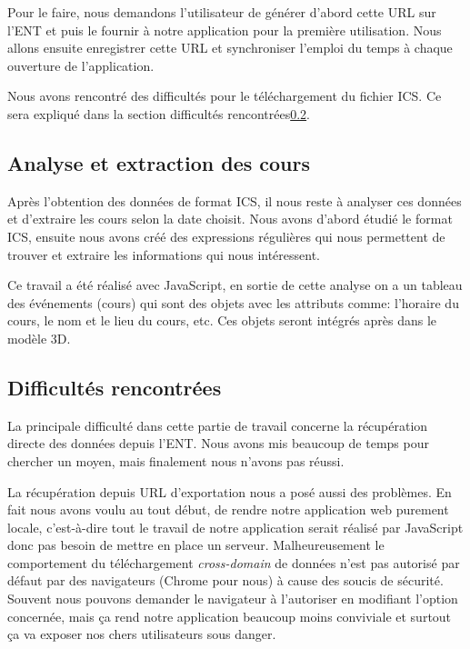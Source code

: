 \documentclass[twoside]{EPURapport}
\begin{document}
Pour le faire, nous demandons l'utilisateur de générer d'abord cette URL sur l'ENT et puis le fournir à notre application pour la première utilisation. Nous allons ensuite enregistrer cette URL et synchroniser l'emploi du temps à chaque ouverture de l'application.


Nous avons rencontré des difficultés pour le téléchargement du fichier ICS. Ce sera expliqué dans la section difficultés rencontrées\ref{sec_diff}.

\subsection{Analyse et extraction des cours}%
Après l'obtention des données de format ICS, il nous reste à analyser ces données et d'extraire les cours selon la date choisit. Nous avons d'abord étudié le format ICS, ensuite nous avons créé des expressions régulières qui nous permettent de trouver et extraire les informations qui nous intéressent. 


Ce travail a été réalisé avec JavaScript, en sortie de cette analyse on a un tableau des événements (cours) qui sont des objets avec les attributs comme: l'horaire du cours, le nom et le lieu du cours, etc. Ces objets seront intégrés après dans le modèle 3D.


\subsection{Difficultés rencontrées}\label{sec_diff} %
La principale difficulté dans cette partie de travail concerne la récupération directe des données depuis l'ENT. Nous avons mis beaucoup de temps pour chercher un moyen, mais finalement nous n'avons pas réussi.


La récupération depuis URL d'exportation nous a posé aussi des problèmes. En fait nous avons voulu au tout début, de rendre notre application web purement locale, c'est-à-dire tout le travail de notre application serait réalisé par JavaScript donc pas besoin de mettre en place un serveur. Malheureusement le comportement du téléchargement \textit{cross-domain} de données n'est pas autorisé par défaut par des navigateurs (Chrome pour nous) à cause des soucis de sécurité. Souvent nous pouvons demander le navigateur à l'autoriser en modifiant l'option concernée, mais ça rend notre application beaucoup moins conviviale et surtout ça va exposer nos chers utilisateurs sous danger.
\end{document}
